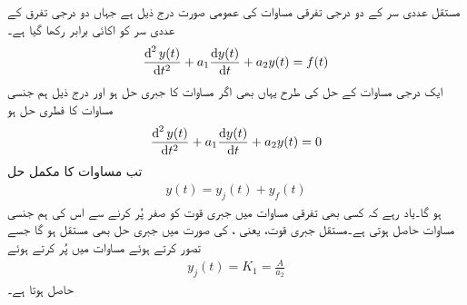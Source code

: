 مستقل عددی سر کے دو درجی تفرقی مساوات کی عمومی صورت درج ذیل ہے جہاں دو درجی تفرق کے عددی سر کو اکائی برابر رکھا گیا ہے۔
\begin{align}\label{مساوات_عارضی_دو_درجی_عمومی_الف}
\frac{\dif^{\,2} y(t)}{\dif t^2}+a_1\frac{\dif y(t)}{\dif t}+a_2 y(t)=f(t)
\end{align}
ایک درجی مساوات کے حل کی طرح یہاں بھی اگر مساوات  کا جبری حل  ہو اور درج ذیل ہم جنسی مساوات کا فطری حل  ہو
 \begin{align}\label{مساوات_عارضی_دو_درجی_عمومی_ہم_جنسی_الف}
\frac{\dif^{\,2} y(t)}{\dif t^2}+a_1\frac{\dif y(t)}{\dif t}+a_2 y(t)=0
\end{align}
تب مساوات  کا مکمل حل
\begin{align}
y(t)=y_j(t)+y_f(t)
\end{align}
ہو گا۔یاد رہے کہ کسی بھی تفرقی مساوات میں جبری قوت کو صفر  پُر کرنے سے اس کی ہم جنسی مساوات حاصل ہوتی ہے۔مستقل جبری قوت، یعنی ، کی صورت میں جبری حل بھی مستقل ہو گا جسے  تصور کرتے ہوئے مساوات  میں پُر کرتے ہوئے
\begin{align}
y_j(t)=K_1=\frac{A}{a_2}
\end{align}
حاصل ہوتا ہے۔

